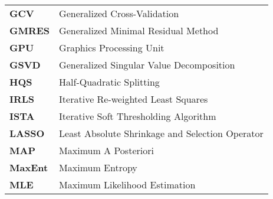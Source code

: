 \begin{flushleft}
\begin{tabular}{ l l }
\textbf{GCV} &  Generalized Cross-Validation \\                                            
\textbf{GMRES} &  Generalized Minimal Residual Method \\   
\textbf{GPU}&Graphics Processing Unit\\                                                       
\textbf{GSVD}& Generalized Singular Value Decomposition\\                         
\textbf{HQS}&Half-Quadratic Splitting\\                                                        
\textbf{IRLS}&Iterative Re-weighted Least Squares\\                                    
\textbf{ISTA}&Iterative Soft Thresholding Algorithm\\                                   
\textbf{LASSO}&Least Absolute Shrinkage and Selection Operator\\              
\textbf{MAP}&Maximum A Posteriori\\                                            
\textbf{MaxEnt}&Maximum Entropy\\                                           
\textbf{MLE}&Maximum Likelihood Estimation\\                                        
\end{tabular}


\end{flushleft}
